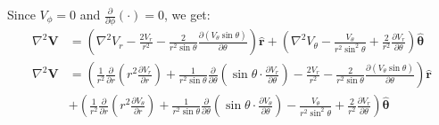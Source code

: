\documentclass[MSc,beforeExam]{iitcsthesis}
\newcommand{\deriv}[2]{\frac{\partial #1}{\partial #2}}
\newcommand\Laplacian{\nabla^2}
\newcommand\bV{\boldsymbol{V}}
\newcommand\br{\boldsymbol{r}}
\newcommand\brhat{\hat{\br}}
\newcommand\btheta{\boldsymbol{\theta}}
\newcommand\bthetahat{\hat{\btheta}}
\begin{document}
Since $V_\phi = 0$ and $\deriv{}{\phi}(\cdot) = 0$, we get:
\begin{align} \nonumber
\Laplacian \bV &= \left(\Laplacian V_r - \frac{2V_r}{r^2} - \frac{2}{r^2 \sin\theta} \deriv{\left(V_\theta \sin\theta \right)}{\theta}\right)\brhat
+
\left(\Laplacian V_\theta - \frac{V_\theta}{r^2 \sin^2\theta} + \frac{2}{r^2}\deriv{V_r}{\theta}\right) \bthetahat
\\
\Laplacian \bV &= \left(
\frac{1}{r^2}\deriv{}{r}\left( r^2 \deriv{V_r}{r} \right) + \frac{1}{r^2 \sin\theta} \deriv{}{\theta} \left( \sin\theta \cdot \deriv{V_r}{\theta}\right)
 - \frac{2V_r}{r^2} - \frac{2}{r^2 \sin\theta} \deriv{\left(V_\theta \sin\theta \right)}{\theta}\right)\brhat \\ \nonumber
&+ \left(
\frac{1}{r^2}\deriv{}{r}\left( r^2 \deriv{V_\theta}{r} \right) + \frac{1}{r^2 \sin\theta} \deriv{}{\theta} \left( \sin\theta \cdot \deriv{V_\theta}{\theta}\right)
 - \frac{V_\theta}{r^2 \sin^2\theta} + \frac{2}{r^2}\deriv{V_r}{\theta}\right) \bthetahat
\end{align}

\clearpage
{}





\end{document}
